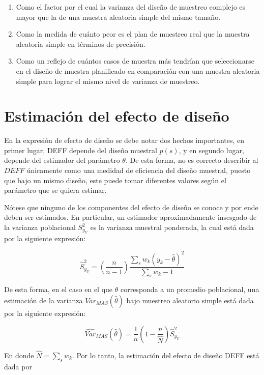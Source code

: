 \documentclass[
  12pt,
  spanish,
]{book}
\providecommand{\tightlist}{%
  \setlength{\itemsep}{0pt}\setlength{\parskip}{0pt}}
\begin{document}
\begin{enumerate}
\def\labelenumi{\arabic{enumi}.}
\tightlist
\item
  Como el factor por el cual la varianza del diseño de muestreo complejo es mayor que la de una muestra aleatoria simple del mismo tamaño.
\item
  Como la medida de cuánto peor es el plan de muestreo real que la muestra aleatoria simple en términos de precisión.
\item
  Como un reflejo de cuántos casos de muestra más tendrían que seleccionarse en el diseño de muestra planificado en comparación con una muestra aleatoria simple para lograr el mismo nivel de varianza de muestreo.
\end{enumerate}

\hypertarget{estimaciuxf3n-del-efecto-de-diseuxf1o}{%
\section{Estimación del efecto de diseño}\label{estimaciuxf3n-del-efecto-de-diseuxf1o}}

En la expresión de efecto de diseño se debe notar dos hechos importantes, en primer lugar, DEFF depende del diseño muestral \(p(s)\), y en segundo lugar, depende del estimador del parámetro \(\theta\). De esta forma, no es correcto describir al \(DEFF\) únicamente como una medidad de eficiencia del diseño muestral, puesto que bajo un mismo diseño, este puede tomar diferentes valores según el parámetro que se quiera estimar.

Nótese que ninguno de los componentes del efecto de diseño se conoce y por ende deben ser estimados. En particular, un estimador aproximadamente insesgado de la varianza poblacional \(S^2_{y_U}\) es la varianza muestral ponderada, la cual está dada por la siguiente expresión:

\[
\hat{S}^2_{y_U} = \left(\frac{n}{n-1}\right)
\frac{\sum_s{ w_k ( y_k - \hat{\theta})^2}}{\sum_s{w_k} -1 }
\]

De esta forma, en el caso en el que \(\theta\) corresponda a un promedio poblacional, una estimación de la varianza \({Var}_{MAS}(\hat{\theta})\) bajo muestreo aleatorio simple está dada por la siguiente expresión:

\[
\widehat{Var}_{MAS}(\hat{\theta}) = \frac{1}{n} \left(1-\frac{n}{\hat N}\right)  \hat{S}^2_{y_U}
\]

En donde \(\hat N = \sum_s w_k\). Por lo tanto, la estimación del efecto de diseño DEFF está dada por
\end{document}
